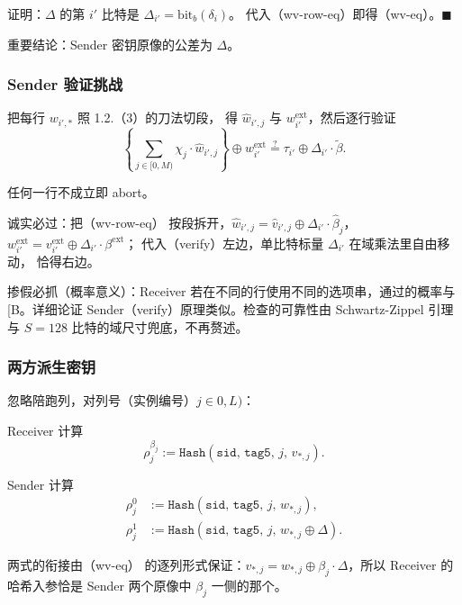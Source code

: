 证明：$\Delta$ 的第 $i'$ 比特是 $\Delta_{i'} = \mathrm{bit}_b\left(\delta_i\right)$。
代入（wv-row-eq）即得（wv-eq）。$\blacksquare$

重要结论：Sender 密钥原像的公差为 $\Delta$。

\subsubsection{Sender 验证挑战}

把每行 $w_{i',*}$ 照 1.2.（3）的刀法切段，
得 $\hat w_{i',j}$ 与 $w^\mathrm{ext}_{i'}$，然后逐行验证
\begin{equation}\label{eq:05-softspoken:verify}
\left\{
    \sum_{j\in[0,M)} \chi_j\cdot\hat w_{i',j}
\right\}
\oplus w^\mathrm{ext}_{i'}
\stackrel{?}{=}
\tau_{i'}\oplus\Delta_{i'}\cdot\tilde\beta. \tag{verify}
\end{equation}

任何一行不成立即 abort。

诚实必过：把（wv-row-eq）
按段拆开，$\hat w_{i',j} = \hat v_{i',j} \oplus \Delta_{i'}\cdot\hat\beta_j$，$w^\mathrm{ext}_{i'} = v^\mathrm{ext}_{i'} \oplus \Delta_{i'}\cdot\beta^\mathrm{ext}$；
代入（verify）左边，单比特标量 $\Delta_{i'}$ 在域乘法里自由移动，
恰得右边。

掺假必抓（概率意义）：Receiver 若在不同的行使用不同的选项串，通过的概率与
{[}B。详细论证 Sender（verify）原理类似。检查的可靠性由 Schwartz-Zippel
引理与 $S = 128$ 比特的域尺寸兜底，不再赘述。

\subsubsection{两方派生密钥}

忽略陪跑列，对列号（实例编号）$j \in 0, L)$：

Receiver 计算
\begin{equation}\label{eq:05-softspoken:12}
\rho^{\beta_j}_j := \mathtt{Hash}\left(\mathtt{sid},\, \mathtt{tag5},\, j,\, v_{*,j}\right).
\end{equation}

Sender 计算
\begin{align}\rho^0_j &:= \mathtt{Hash}\left(\mathtt{sid},\, \mathtt{tag5},\, j,\,
    w_{*,j}
\right),\\
\rho^1_j &:= \mathtt{Hash}\left(\mathtt{sid},\, \mathtt{tag5},\, j,\,
    w_{*,j} \oplus \Delta
\right). \tag{keys}
\end{align}

两式的衔接由（wv-eq）
的逐列形式保证：$v_{*,j} = w_{*,j} \oplus \beta_j\cdot\Delta$，所以
Receiver 的哈希入参恰是 Sender 两个原像中 $\beta_j$ 一侧的那个。


